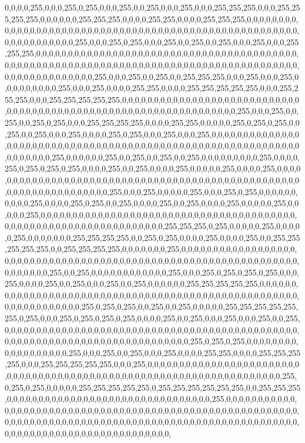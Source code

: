 0,0,0,0,255,0,0,0,255,0,255,0,0,0,255,0,0,255,0,0,0,255,0,0,0,255,255,255,0,0,0,255,255,255,255,0,0,0,0,0,0,255,255,255,0,0,0,0,255,255,0,0,0,0,255,255,255,0,0,0,0,0,0,0,0,0,0,0,0,0,0,0,0,0,0,0,0,0,0,0,0,0,0,0,0,0,0,0,0,0,0,0,0,0,0,0,0,0,0,0,0,0,0,0,0,0,0,0,0,0,0,0,0,0,0,0,0,0,0,0,0,0,255,0,0,0,255,0,255,0,0,0,255,0,0,255,0,0,255,0,0,0,255,0,0,0,255,255,255,0,0,0,0,0,0,0,0,0,0,0,0,0,0,0,0,0,0,0,0,0,0,0,0,0,0,0,0,0,0,0,0,0,0,0,0,0,0,0,0,0,0,0,0,0,0,0,0,0,0,0,0,0,0,0,0,0,0,0,0,0,0,0,0,0,0,0,0,0,0,0,0,0,0,0,0,0,0,0,0,0,0,0,0,0,0,0,0,0,0,0,0,0,0,0,0,0,0,0,0,0,255,0,0,0,255,0,0,255,0,0,255,255,255,0,0,0,255,0,0,0,255,0,0,0,0,0,0,0,0,0,255,0,0,0,255,0,0,0,0,255,255,0,0,0,0,255,255,255,255,255,0,0,0,255,255,255,0,0,0,255,255,255,255,255,0,0,0,0,0,0,0,0,0,0,0,0,0,0,0,0,0,0,0,0,0,0,0,0,0,0,0,0,0,0,0,0,0,0,0,0,0,0,0,0,0,0,0,0,0,0,0,0,0,0,0,0,0,0,0,0,0,0,0,0,0,0,0,0,255,0,0,0,255,0,0,255,0,0,255,0,255,0,0,0,255,255,255,255,0,0,0,0,255,255,0,0,0,0,0,255,0,255,0,255,0,0,255,0,0,255,0,0,0,255,0,0,0,0,255,0,255,0,0,0,255,0,0,0,255,0,0,0,0,0,0,0,0,0,0,0,0,0,0,0,0,0,0,0,0,0,0,0,0,0,0,0,0,0,0,0,0,0,0,0,0,0,0,0,0,0,0,0,0,0,0,0,0,0,0,0,0,0,0,0,0,0,0,0,0,0,0,0,0,0,0,0,255,0,0,0,0,0,0,255,0,0,255,0,0,255,0,0,255,0,0,0,0,0,0,0,0,0,255,0,0,0,0,255,0,255,0,255,0,255,0,0,0,0,255,0,0,255,0,0,0,0,255,0,0,0,0,0,255,0,0,0,0,255,0,0,0,0,0,0,0,0,0,0,0,0,0,0,0,0,0,0,0,0,0,0,0,0,0,0,0,0,0,0,0,0,0,0,0,0,0,0,0,0,0,0,0,0,0,0,0,0,0,0,0,0,0,0,0,0,0,0,0,0,0,0,0,0,0,0,255,0,0,0,255,0,0,0,0,0,255,0,0,0,255,0,255,0,0,0,0,0,0,0,0,0,0,255,0,0,0,0,255,0,255,0,0,255,0,0,0,0,255,0,0,255,0,0,0,0,255,0,0,0,0,0,255,0,0,0,0,0,255,0,0,0,0,0,0,0,0,0,0,0,0,0,0,0,0,0,0,0,0,0,0,0,0,0,0,0,0,0,0,0,0,0,0,0,0,0,0,0,0,0,0,0,0,0,0,0,0,0,0,0,0,0,0,0,0,0,0,0,0,0,0,0,0,0,255,255,255,0,255,0,0,0,0,0,255,0,0,0,0,0,255,0,0,0,0,0,0,0,255,255,255,255,0,0,255,0,255,0,0,0,0,255,0,0,0,0,255,0,0,255,255,255,255,255,0,0,255,255,255,255,0,0,0,0,0,0,0,255,0,0,0,0,0,0,0,0,0,0,0,0,0,0,0,0,0,0,0,0,0,0,0,0,0,0,0,0,0,0,0,0,0,0,0,0,0,0,0,0,0,0,0,0,0,0,0,0,0,0,0,0,0,0,0,0,0,0,0,0,0,0,0,0,0,0,0,0,0,0,0,255,0,0,255,0,0,0,0,0,0,0,0,0,0,0,0,255,0,0,0,255,0,255,0,255,0,255,0,0,0,255,0,0,0,0,255,0,0,255,0,0,0,255,0,0,255,0,0,0,0,0,0,255,255,255,255,255,0,0,0,0,0,0,0,0,0,0,0,0,0,0,0,0,0,0,0,0,0,0,0,0,0,0,0,0,0,0,0,0,0,0,0,0,0,0,0,0,0,0,0,0,0,0,0,0,0,0,0,0,0,0,0,0,0,0,0,0,0,0,0,0,255,0,255,0,255,0,0,255,0,0,255,0,0,0,0,0,255,255,255,255,255,255,0,255,0,0,0,255,0,255,0,255,0,255,0,0,0,0,255,0,0,255,0,0,0,255,0,0,0,255,0,0,255,0,0,0,0,0,0,0,0,0,0,0,0,0,0,0,0,0,0,0,0,0,0,0,0,0,0,0,0,0,0,0,0,0,0,0,0,0,0,0,0,0,0,0,0,0,0,0,0,0,0,0,0,0,0,0,0,0,0,0,0,0,0,0,0,0,0,0,0,0,0,0,0,0,0,0,255,0,255,0,255,0,0,0,0,0,0,0,0,0,0,0,0,0,0,0,0,0,0,255,0,0,0,255,0,0,255,0,0,0,255,0,0,0,0,255,255,0,0,0,0,255,255,255,255,0,0,0,255,255,255,255,255,0,0,0,255,0,0,0,0,0,0,0,0,0,0,0,0,0,0,0,0,0,0,0,0,0,0,0,0,0,0,0,0,0,0,0,0,0,0,0,0,0,0,0,0,0,0,0,0,0,0,0,0,0,0,0,0,0,0,0,0,0,0,0,0,0,0,0,0,0,0,0,255,0,255,0,255,0,0,0,0,0,255,255,255,255,255,0,255,255,255,255,255,255,0,0,255,255,255,0,0,0,0,0,0,0,0,0,0,0,0,0,0,0,0,0,0,0,0,0,0,0,0,0,0,0,0,0,0,0,0,255,0,0,0,0,0,0,0,0,0,0,0,0,0,0,0,0,0,0,0,0,0,0,0,0,0,0,0,0,0,0,0,0,0,0,0,0,0,0,0,0,0,0,0,0,0,0,0,0,0,0,0,0,0,0,0,0,0,0,0,0,0,0,0,0,0,0,0,0,0,0,0,0,0,0,0,0,0,0,0,0,0,0,0,0,0,0,0,0,0,0,0,0,0,0,0,0,0,0,0,0,0,0,0,0,0,0,0,0,0,0,0,0,0,0,0,0,0,0,0,0,0,0,0,0,0,0,0,0,0,